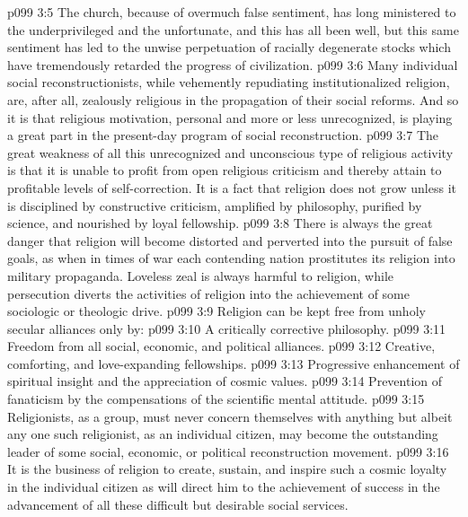 \vs p099 3:5 The church, because of overmuch false sentiment, has long ministered to the underprivileged and the unfortunate, and this has all been well, but this same sentiment has led to the unwise perpetuation of racially degenerate stocks which have tremendously retarded the progress of civilization.\plusone
\vs p099 3:6 Many individual social reconstructionists, while vehemently repudiating institutionalized religion, are, after all, zealously religious in the propagation of their social reforms. And so it is that religious motivation, personal and more or less unrecognized, is playing a great part in the present\hyp{}day program of social reconstruction.
\pc \vs p099 3:7 The great weakness of all this unrecognized and unconscious type of religious activity is that it is unable to profit from open religious criticism and thereby attain to profitable levels of self\hyp{}correction. It is a fact that religion does not grow unless it is disciplined by constructive criticism, amplified by philosophy, purified by science, and nourished by loyal fellowship.
\vs p099 3:8 There is always the great danger that religion will become distorted and perverted into the pursuit of false goals, as when in times of war each contending nation prostitutes its religion into military propaganda. Loveless zeal is always harmful to religion, while persecution diverts the activities of religion into the achievement of some sociologic or theologic drive.
\pc \vs p099 3:9 Religion can be kept free from unholy secular alliances only by:
\pc \vs p099 3:10 \bibnobreakspace A critically corrective philosophy.
\vs p099 3:11 \bibnobreakspace Freedom from all social, economic, and political alliances.
\vs p099 3:12 \bibnobreakspace Creative, comforting, and love\hyp{}expanding fellowships.
\vs p099 3:13 \bibnobreakspace Progressive enhancement of spiritual insight and the appreciation of cosmic values.
\vs p099 3:14 \bibnobreakspace Prevention of fanaticism by the compensations of the scientific mental attitude.
\pc \vs p099 3:15 Religionists, as a group, must never concern themselves with anything but  albeit any one such religionist, as an individual citizen, may become the outstanding leader of some social, economic, or political reconstruction movement.
\vs p099 3:16 It is the business of religion to create, sustain, and inspire such a cosmic loyalty in the individual citizen as will direct him to the achievement of success in the advancement of all these difficult but desirable social services.\plusone
